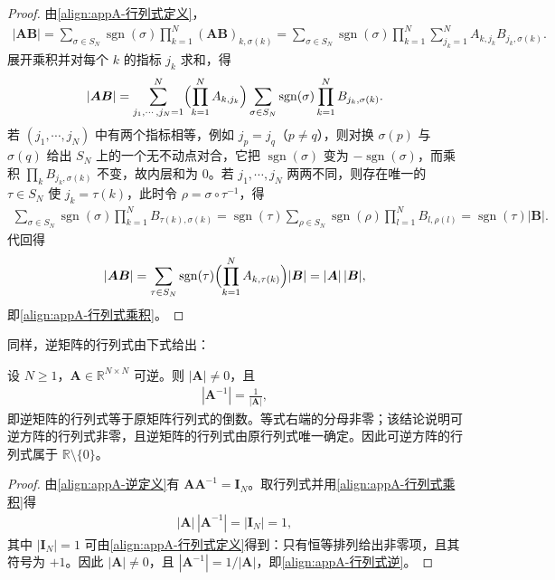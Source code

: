 \documentclass[../main.tex]{subfiles}
\begin{document}
\begin{proof}
由\eqref{align:appA-行列式定义}，
\begin{align*}
 |\bm{A}\bm{B}|=\sum_{\sigma\in S_N}\operatorname{sgn}(\sigma)\prod_{k=1}^{N}(\bm{A}\bm{B})_{k,\sigma(k)}
 =\sum_{\sigma\in S_N}\operatorname{sgn}(\sigma)\prod_{k=1}^{N}\sum_{j_k=1}^{N}A_{k,j_k}B_{j_k,\sigma(k)}.
\end{align*}
展开乘积并对每个 $k$ 的指标 $j_k$ 求和，得
\begin{align*}
 |\bm{A}\bm{B}|=\sum_{j_1,\cdots,j_N=1}^{N}\Bigl(\prod_{k=1}^{N}A_{k,j_k}\Bigr)\sum_{\sigma\in S_N}\operatorname{sgn}(\sigma)\prod_{k=1}^{N}B_{j_k,\sigma(k)}.
\end{align*}
若 $(j_1,\cdots,j_N)$ 中有两个指标相等，例如 $j_p=j_q$（$p\neq q$），则对换 $\sigma(p)$ 与 $\sigma(q)$ 给出 $S_N$ 上的一个无不动点对合，它把 $\operatorname{sgn}(\sigma)$ 变为 $-\operatorname{sgn}(\sigma)$，而乘积 $\prod_{k}B_{j_k,\sigma(k)}$ 不变，故内层和为 $0$。若 $j_1,\cdots,j_N$ 两两不同，则存在唯一的 $\tau\in S_N$ 使 $j_k=\tau(k)$，此时令 $\rho=\sigma\circ\tau^{-1}$，得
\begin{align*}
 \sum_{\sigma\in S_N}\operatorname{sgn}(\sigma)\prod_{k=1}^{N}B_{\tau(k),\sigma(k)}
 =\operatorname{sgn}(\tau)\sum_{\rho\in S_N}\operatorname{sgn}(\rho)\prod_{l=1}^{N}B_{l,\rho(l)}
 =\operatorname{sgn}(\tau)|\bm{B}|.
\end{align*}
代回得
\begin{align*}
 |\bm{A}\bm{B}|=\sum_{\tau\in S_N}\operatorname{sgn}(\tau)\Bigl(\prod_{k=1}^{N}A_{k,\tau(k)}\Bigr)|\bm{B}|=|\bm{A}|\,|\bm{B}|,
\end{align*}
即\eqref{align:appA-行列式乘积}。
\end{proof}

同样，逆矩阵的行列式由下式给出：
\begin{proposition}[逆矩阵的行列式]\label{proposition:appA-逆的行列式}
设 $N\geqslant1$，$\bm{A}\in\mathbb{R}^{N\times N}$ 可逆。则 $|\bm{A}|\neq0$，且
\begin{align}
  |\bm{A}^{-1}|=\frac{1}{|\bm{A}|},
  \label{align:appA-行列式逆}
\end{align}
即逆矩阵的行列式等于原矩阵行列式的倒数。等式右端的分母非零；该结论说明可逆方阵的行列式非零，且逆矩阵的行列式由原行列式唯一确定。因此可逆方阵的行列式属于 $\mathbb{R}\setminus\{0\}$。
\end{proposition}

\begin{proof}
由\eqref{align:appA-逆定义}有 $\bm{A}\bm{A}^{-1}=\bm{I}_{N}$。取行列式并用\eqref{align:appA-行列式乘积}得
\begin{align*}
 |\bm{A}|\,|\bm{A}^{-1}|=|\bm{I}_{N}|=1,
\end{align*}
其中 $|\bm{I}_{N}|=1$ 可由\eqref{align:appA-行列式定义}得到：只有恒等排列给出非零项，且其符号为 $+1$。因此 $|\bm{A}|\neq0$，且 $|\bm{A}^{-1}|=1/|\bm{A}|$，即\eqref{align:appA-行列式逆}。
\end{proof}
\end{document}
